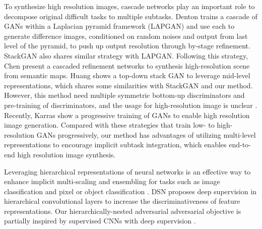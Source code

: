 \documentclass[10pt,twocolumn,letterpaper]{article}
\begin{document}
To synthesize high resolution images, cascade networks play an important role to decompose original difficult tasks to multiple subtasks.
Denton \etal \cite{denton2015deep} trains a cascade of GANs within a Laplacian pyramid framework (LAPGAN) and use each to generate difference images, conditioned on random noises and output from last level of the pyramid, to push up output resolution through by-stage refinement. StackGAN also shares similar strategy with LAPGAN. Following this strategy, Chen \etal \cite{chen2017photographic} present a cascaded refinement networks to synthesis high-resolution scene from semantic maps. 
Huang \etal \cite{huang2016stacked}
shows a top-down stack GAN to leverage mid-level representations, which shares some similarities with StackGAN and our method. However, this method need multiple symmetric  bottom-up discriminators and pre-training of discriminators, and the usage for high-resolution image is unclear \cite{han2017stackgan}. Recently, Karras \cite{} show a progressive training of GANs to enable high resolution image generation. Compared with these strategies that train low- to high-resolution GANs progressively, our method has advantages of utilizing multi-level representations to encourage implicit subtask integration, which enables end-to-end high resolution image synthesis.


Leveraging hierarchical representations of neural networks is an effective way to enhance implicit multi-scaling and ensembling for tasks such as image classification \cite{lee2015deeply} and pixel or object classification \cite{xie2015holistically,cai2016unified,long2015fully}. DSN \cite{lee2015deeply} proposes deep supervision in hierarchical convolutional layers to increase the discriminativeness of feature representations. 
Our hierarchically-nested adversarial adversarial objective is partially inspired by supervised CNNs with deep supervision \cite{lee2015deeply,xie2015holistically}. 
\begin{figure}[t]
	\centering
	\caption{} \label{fig:archs}
\end{figure}

%
%
%
\begin{figure}[t]
	\centering
	\caption{} \label{fig:archs-compare}
\end{figure}
\end{document}
